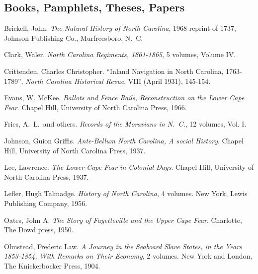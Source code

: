 \documentclass[11pt, a5paper, openright]{book}
\begin{document}
\begin{thebibliography}{99}

\section*{Books, Pamphlets, Theses, Papers}

  Brickell, John.  \emph{The Natural History of North Carolina}, 1968
  reprint of 1737, Johnson Publishing Co., Murfreesboro, N.~C.

  Clark, Waler.  \emph{North Carolina Regiments, 1861-1865}, %
  5 volumes, Volume IV. %

  Crittenden, Charles Christopher.  ``Inland Navigation in North Carolina, 1763-1789'', %
  \emph{North Carolina Historical Revue}, VIII (April 1931), 145-154. %

  Evans, W. McKee.  \emph{Ballots and Fence Rails, Reconstruction on the Lower Cape Fear}.
  Chapel Hill, University of North Carolina Press, 1966.

  Fries, A.~L.~and others.  \emph{Records of the Moravians in N.~C.},
  12 volumes, Vol. I.

  Johnson, Guion Griffis.  \emph{Ante-Bellum North Carolina, A social History}.
  Chapel Hill, University of North Carolina Press, 1937.

  Lee, Lawrence.  \emph{The Lower Cape Fear in Colonial Days}.
  Chapel Hill, University of North Carolina Press, 1937.

  Lefler, Hugh Talmadge.  \emph{History of North Carolina}, 4 volumes.  New
  York, Lewis Publishing Company, 1956.

  Oates, John A.  \emph{The Story of Fayetteville and the Upper Cape Fear}.
  Charlotte, The Dowd press, 1950.

  Olmstead, Frederic Law.  \emph{A Journey in the Seaboard Slave States, in the
    Years 1853-1854, With Remarks on Their Economy}, 2 volumes.  New York and %
  London, The Knickerbocker Press, 1904.


\end{thebibliography}
\end{document}
